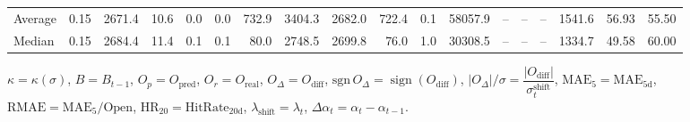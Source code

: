 \begin{threeparttable}
{\begin{tabular}{lrrrrrrrrrrrrrrrrr}
Average &     0.15 & 2671.4 &              10.6 &               0.0 &                0.0 &              732.9 &  3404.3 & 2682.0 &      722.4 &                      0.1 &             58057.9 &         -- &        -- &             -- &           1541.6 &           56.93 &                  55.50 \\
 Median &     0.15 & 2684.4 &              11.4 &               0.1 &                0.1 &               80.0 &  2748.5 & 2699.8 &       76.0 &                      1.0 &             30308.5 &         -- &        -- &             -- &           1334.7 &           49.58 &                  60.00 \\
\bottomrule
\end{tabular}
}
\begin{tablenotes}\footnotesize
\item $\kappa=\kappa(\sigma)$, $B=B_{t-1}$, $O_p=O_{\text{pred}}$, $O_r=O_{\text{real}}$, $O_\Delta=O_{\text{diff}}$, $\mathrm{sgn}\,O_\Delta=\operatorname{sign}(O_{\text{diff}})$, $|O_\Delta|/\sigma=\dfrac{|O_{\text{diff}}|}{\sigma_t^{\text{shift}}}$, $\mathrm{MAE}_5=\mathrm{MAE}_{5\text{d}}$, $\mathrm{RMAE}= \mathrm{MAE}_5 / \text{Open}$, $\mathrm{HR}_{20}=\mathrm{HitRate}_{20\text{d}}$, 
$\lambda_{\text{shift}}=\lambda_t$, 
$\Delta\alpha_t=\alpha_t-\alpha_{t-1}$.
\end{tablenotes}
\end{threeparttable}
\endgroup

